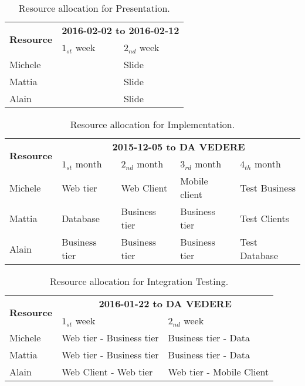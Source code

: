 \begin{table}
    \centering
    \begin{tabular}{| l | l | l |}
        \hline
        \multirow{2}{*}{\textbf{Resource}} & \multicolumn{2}{c|}{\textbf{2016-02-02 to 2016-02-12}} \\
        \cline{2-3}
        & $1_{st}$ week & $2_{nd}$ week \\
        \hline
        Michele         &     & Slide    \\
        Mattia          &     & Slide    \\
        Alain           &     & Slide    \\
        \hline
    \end{tabular}
    \caption{Resource allocation for Presentation.}
    \label{tab:pres-res-alloc}
\end{table}


\begin{table}
    \centering
    \begin{tabular}{| l | l | l | l | l |}
        \hline
        \multirow{2}{*}{\textbf{Resource}} & \multicolumn{4}{c|}{\textbf{2015-12-05 to DA VEDERE}} \\
        \cline{2-5}
        & $1_{st}$ month & $2_{nd}$ month & $3_{rd} $ month & $4_{th}$ month\\
        \hline
        Michele        & Web tier       & Web Client     & Mobile client   & Test Business    \\
        Mattia         & Database       & Business tier  & Business tier   & Test Clients   \\
        Alain          & Business tier  & Business tier  & Business tier   & Test Database  \\
        \hline
    \end{tabular}
    \caption{Resource allocation for Implementation.}
    \label{tab:impl-res-alloc}
\end{table}

\begin{table}
    \centering
    \begin{tabular}{| l | l | l |}
        \hline
        \multirow{2}{*}{\textbf{Resource}} & \multicolumn{2}{c|}{\textbf{2016-01-22 to DA VEDERE}} \\
        \cline{2-3}
        & $1_{st}$ week & $2_{nd}$ week \\
        \hline
        Michele       &   Web tier - Business tier    & Business tier  - Data     \\
        Mattia        &   Web tier - Business tier    & Business tier  - Data    \\
        Alain         &   Web Client - Web tier       & Web tier - Mobile Client    \\
        \hline
    \end{tabular}
    \caption{Resource allocation for Integration Testing.}
    \label{tab:int-test-res-alloc}
\end{table}
